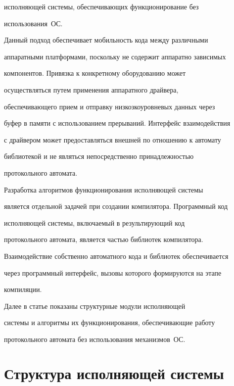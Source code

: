 исполняющей сис\-те\-мы, обес\-пе\-чи\-ва\-ющих функционирование без 


использования~ОС. 


      


      Данный подход обеспечивает мобильность кода между различными 


аппаратными платформами, поскольку не содержит аппаратно зависимых 


компонентов. Привязка к конкретному оборудованию может 


осуществляться путем применения аппаратного драйвера, 


обеспечивающего прием и отправку низкозкоуровневых данных через 


буфер в памяти с использованием прерываний. Интерфейс взаимодействия 


с драйвером может предоставляться внешней по отношению к автомату 


библиотекой и не являться непосредственно принадлежностью 


протокольного автомата.


      


      Разработка алгоритмов функционирования исполняющей сис\-те\-мы 


является отдельной задачей при создании компилятора. Программный код 


исполняющей сис\-те\-мы, включаемый в результирующий код 


протокольного автомата, является частью библиотек компилятора. 


Взаимодействие собственно автоматного кода и библиотек обеспечивается 


через программный интерфейс, вызовы которого формируются на этапе 


компиляции.


      


      Далее в статье показаны структурные модули исполняющей 


сис\-те\-мы и алгоритмы их функционирования, обеспечивающие работу 


протокольного автомата без использования механизмов~ОС.


      


\section{Структура исполняющей сис\-те\-мы}


